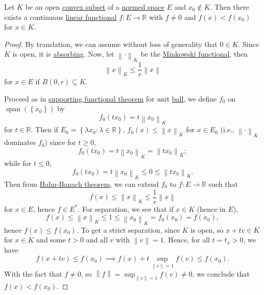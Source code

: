 \begin{theorem}\label{thm:separation-of-a-point-from-a-convex-set}
	Let \(K\) be an open \hyperref[def:convex-set]{convex subset} of a \hyperref[def:normed-vector-space]{normed space} \(E\) and \(x_0 \notin K\). Then there exists a continuous \hyperref[def:linear-functional]{linear functional} \(f\colon E\to \mathbb{R} \) with \(f\neq 0\) and \(f(x) < f(x_0)\) for \(x\in K\).
\end{theorem}
\begin{proof}
	By translation, we can assume without loss of generality that \(0\in K\). Since \(K\) is open, it is \hyperref[def:absorbing]{absorbing}. Now, let \(\left\lVert \cdot\right\rVert _K\) be the \hyperref[def:Minkowski-functional]{Minkowski functional}, then
	\[
		\left\lVert x\right\rVert _K \leq \frac{1}{r}\left\lVert x\right\rVert
	\]
	for \(x\in E\) if \(B(0, r)\subseteq K\).
	\begin{center}
	\end{center}
	Proceed as in \hyperref[thm:supporting-functional]{supporting functional theorem} for unit \hyperref[def:ball]{ball}, we define \(f_0\) on \(\operatorname{span}(\left\{ x_0 \right\} )\) by
	\[
		f_0(tx_0) = t\left\lVert x_0\right\rVert_K
	\]
	for \(t\in \mathbb{R} \). Then if \(E_0 = \left\{ \lambda x_0 \colon \lambda \in \mathbb{R}  \right\} \), \(f_0 (x) \leq \left\lVert x\right\rVert _K\) for \(x\in E_0\) (i.e., \(\left\lVert \cdot\right\rVert _K\) dominates \(f_0\)) since for \(t \geq 0\),
	\[
		f_0 (tx_0) = t \left\lVert x_0\right\rVert _K= \left\lVert t x_0\right\rVert _K;
	\]
	while for \(t \leq 0\),
	\[
		f_0 ( tx_0) = t\left\lVert x_0\right\rVert _K \leq 0\leq \left\lVert t x_0\right\rVert _K.
	\]
	Then from \hyperref[thm:Hahn-Banach]{Hahn-Banach theorem}, we can extend \(f_0\) to \(f\colon E\to \mathbb{R} \) such that
	\[
		f(x) \leq \left\lVert x\right\rVert _K \leq \frac{1}{r} \left\lVert x\right\rVert
	\]
	for \(x\in E\), hence \(f\in E^{\ast} \). For separation, we see that if \(x\in K\) (hence in \(E\)),
	\[
		f(x) \leq \left\lVert x\right\rVert _K \leq 1 \leq \left\lVert x_0\right\rVert _K = f_0 (x_0) = f(x_0),
	\]
	hence \(f(x) \leq f(x_0)\). To get a strict separation, since \(K\) is open, so \(x + tv\in K\) for \(x\in K\) and some \(t > 0\) and all \(v\) with \(\left\lVert v\right\rVert = 1\). Hence, for all \(t = t_x > 0\), we have
	\[
		f(x + tv) \leq f(x_0) \implies f(x) + t \sup _{\left\lVert v\right\rVert = 1}f(v) \leq f(x_0).
	\]
	With the fact that \(f\neq 0\), so \(\left\lVert f\right\rVert = \sup _{\left\lVert v\right\rVert = 1}f(v) \neq 0\), we conclude that \(f(x) < f(x_0)\).
\end{proof}

